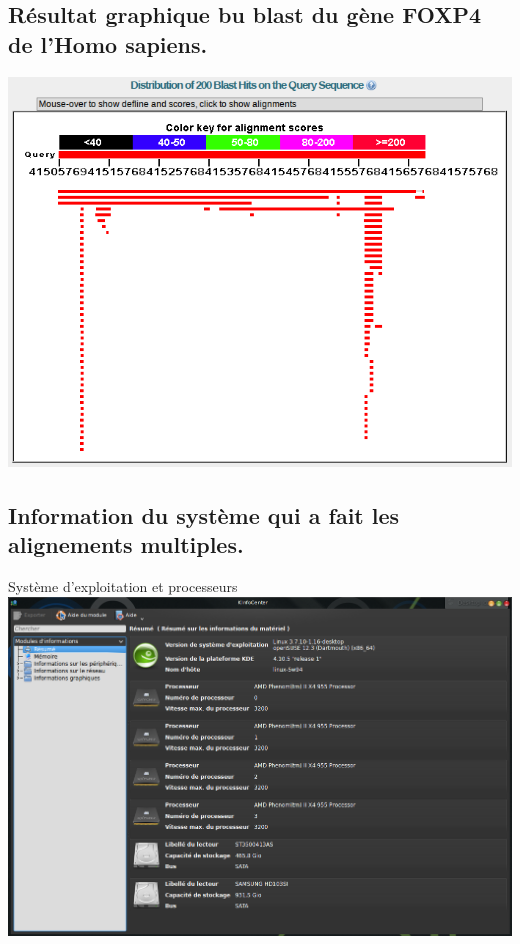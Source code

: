\documentclass[10.8pt]{article} %
\begin{document}
\subsection{Résultat graphique bu blast du gène FOXP4 de l'Homo sapiens.}\label{15}
\includegraphics[width=\linewidth]{annexes/question4/FOXP4_megablast_result.png}

\subsection{Information du système qui a fait les alignements multiples.}\label{16}

Système d'exploitation et processeurs\\
\includegraphics[width=\linewidth]{annexes/question4/systeme_1.png}
\end{document}
